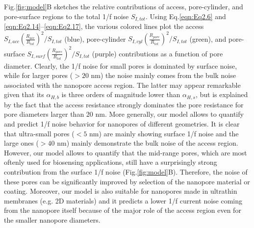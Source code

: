 Fig.\ref{fig:model}B sketches the relative contributions of access, pore-cylinder, and pore-surface regions to the total 1/f noise $S_{I,tot}$. Using Eq.\ref{eqn:Eq2.6} and \ref{eqn:Eq2.14}–\ref{eqn:Eq2.17}, the various colored lines plot the access $S_{I,acc}\left(\frac{R_{acc}}{R_{tot}}\right)^2/S_{I,tot}$ (blue), pore-cylinder $S_{I,cyl}\left(\frac{R_{pore}}{R_{tot}}\right)^2/S_{I,tot}$  (green), and pore-surface $S_{I,surf}\left(\frac{R_{pore}}{R_{tot}}\right)^2/S_{I,tot}$   (purple) contributions as a function of pore diameter. Clearly, the 1/f noise for small pores is dominated by surface noise, while for larger pores ($>20$ nm) the noise mainly comes from the bulk noise associated with the nanopore access region. The latter may appear remarkable given that its $\alpha_{H,b}$ is three orders of magnitude lower than $\alpha_{H,s}$, but is explained  by the fact that the access resistance strongly dominates the pore resistance for pore diameters larger than 20 nm.
More generally, our model allows to quantify and predict 1/f noise behavior for nanopores of different geometries. It is clear that ultra-small pores ($<5$ nm) are mainly showing surface 1/f noise and the large ones ($>40$ nm) mainly demonstrate the bulk noise of the access region. However, our model allows to quantify that the mid-range pores, which are most oftenly used for biosensing applications, still have a surprisingly strong contribution from the surface 1/f noise (Fig.\ref{fig:model}B). Therefore, the noise of these pores can be significantly improved by selection of the nanopore material or coating. Moreover, our model is also suitable for nanopores made in ultrathin membranes (e.g. 2D materials) and it predicts a lower 1/f current noise coming from the nanopore itself because of the major role of the access region even for the smaller nanopore diameters. 



